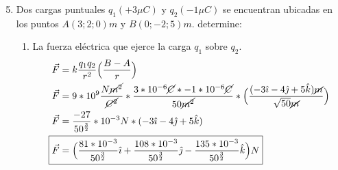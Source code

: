 \documentclass[12pt, twoside]{article}
\begin{document}
\begin{enumerate}
	\setcounter{enumi}{4}
	\item Dos cargas puntuales $q_1(+3\mu C)$ y $q_2(-1\mu C)$
		se encuentran ubicadas en los puntos $A(3;2;0)m$ y $B(0;-2;5)m$.
		determine:
		\begin{enumerate}
			\item La fuerza eléctrica que ejerce la carga $q_1$ sobre $q_2$.
				\begin{align*}
					\vec{F} &= k \frac{q_1q_2}{r^2} \Big{(} \frac{B-A}{r} \Big{)}\\
					\vec{F} &= 9*10^9 \frac{N\cancel{m^2}}{\cancel{C^2}}*
					\frac{3*10^{-6}\cancel{C}*-1*10^{-6}\cancel{C}}{50\cancel{m^2}}*
					\Big{(} \frac{(-3\hat{\imath}-4\hat{\jmath}+5\hat{k})\cancel{m}}{\sqrt{50}\cancel{m}} \Big{)}\\
					\vec{F} &= \frac{-27}{50^ \frac{3}{2} } *10^{-3} N*
					(-3\hat{\imath}-4\hat{\jmath}+5\hat{k})\\
					\Aboxed{
						\vec{F} &= \Big{(}
						\frac{81*10^{-3}}{50^{ \frac{3}{2} }}\hat{\imath}+
						\frac{108*10^{-3}}{50^{ \frac{3}{2} }}\hat{\jmath}-
						\frac{135*10^{-3}}{50^{ \frac{3}{2} }}\hat{k}
						\Big{)}N
					}
				\end{align*}


\end{enumerate}
\end{enumerate}
\end{document}
